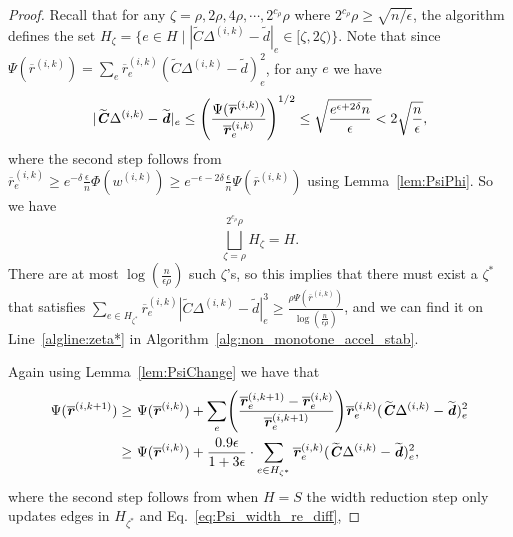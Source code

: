\documentclass[11pt]{article}
\let\originalleft\left
\let\originalright\right
\renewcommand{\left}{\mathopen{}\mathclose\bgroup\originalleft}
\renewcommand{\right}{\aftergroup\egroup\originalright}
\newcommand\dd{\boldsymbol{\mathit{d}}}
\newcommand\rr{\boldsymbol{\mathit{r}}}
\newcommand\ww{\boldsymbol{\mathit{w}}}
\newcommand\CC{\boldsymbol{\mathit{C}}}
\newcommand{\wt}{\widetilde}
\newcommand{\ov}{\overline}
\begin{document}
\begin{proof}
Recall that for any $\zeta = \rho, 2 \rho, 4 \rho, \cdots,  2^{c_\rho} \rho$ where $2^{c_{\rho}} \rho \geq \sqrt{n/\epsilon}$, the algorithm defines the set $H_{\zeta} = \{e \in H \mid |\wt{\CC} \Delta^{(i,k)} - \wt{\dd}|_e \in [\zeta, 2 \zeta)\}$. Note that since $\Psi(\ov{\rr}^{(i,k)}) = \sum_e \ov{\rr}^{(i,k)}_e (\wt{\CC} \Delta^{(i,k)} - \wt{\dd})_e^2$, for any $e$ we have 
\[
|\wt{\CC} \Delta^{(i,k)} - \wt{\dd}|_e \leq \left(\frac{\Psi(\ov{\rr}^{(i,k)})}{\ov{\rr}^{(i,k)}_e}\right)^{1/2} \leq \sqrt{\frac{e^{\epsilon+2\delta} n}{\epsilon}} < 2 \sqrt{\frac{n}{\epsilon}},
\]
where the second step follows from $\ov{\rr}^{(i,k)}_e \geq e^{-\delta} \frac{\epsilon}{n} \Phi(\ww^{(i,k)}) \geq e^{-\epsilon-2\delta} \frac{\epsilon}{n} \Psi(\ov{\rr}^{(i,k)})$ using Lemma~\ref{lem:PsiPhi}. So we have
\[
\bigsqcup_{\zeta = \rho}^{2^{c_{\rho}} \rho} H_{\zeta} = H.
\]
There are at most $\log(\frac{n}{\epsilon \rho})$ such $\zeta$'s, so this implies that there must exist a $\zeta^*$ that satisfies $\sum_{e \in H_{\zeta^*}} \ov{\rr}^{(i,k)}_e |\wt{\CC} \Delta^{(i,k)} - \wt{\dd}|_e^3 \geq \frac{\rho \Psi(\ov{\rr}^{(i,k)})}{\log(\frac{n}{\epsilon \rho})}$, and we can find it on Line~\ref{algline:zeta*} in Algorithm~\ref{alg:non_monotone_accel_stab}. 

Again using Lemma~\ref{lem:PsiChange} we have that
\begin{align}\label{eq:Psi_width_H_equal_S}
\Psi(\ov{\rr}^{(i,k+1)}) \geq &~ \Psi(\ov{\rr}^{(i,k)})+ \sum_e \left(\frac{\ov{\rr}^{(i,k+1)}_e-\ov{\rr}^{(i,k)}_e}{\ov{\rr}^{(i,k+1)}_e}\right)\ov{\rr}^{(i,k)}_e (\wt{\CC} \Delta^{(i,k)}-\wt{\dd})_e^2 \notag \\
\geq &~ \Psi(\ov{\rr}^{(i,k)}) + \frac{0.9 \epsilon}{1 + 3 \epsilon} \cdot \sum_{e \in H_{\zeta^*}} \ov{\rr}^{(i,k)}_e (\wt{\CC} \Delta^{(i,k)}-\wt{\dd})_e^2,
\end{align}
where the second step follows from when $H = S$ the width reduction step only updates edges in $H_{\zeta^*}$ and Eq.~\eqref{eq:Psi_width_re_diff},


\end{proof}
\end{document}
